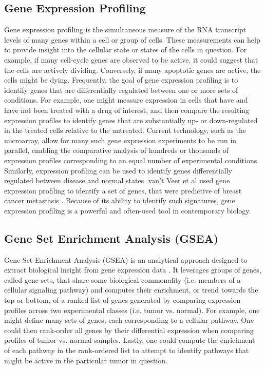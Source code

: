 \documentclass[12pt]{article}
\begin{document}
\subsection{Gene Expression Profiling}

Gene expression profiling is the simultaneous measure of the RNA transcript levels of many genes within a cell or group of cells. These measurements can help to provide insight into the cellular state or states of the cells in question. For example, if many cell-cycle genes are observed to be active, it could suggest that the cells are actively dividing. Conversely, if many apoptotic genes are active, the cells might be dying. Frequently, the goal of gene expression profiling is to identify genes that are differentially regulated between one or more sets of conditions. For example, one might measure expression in cells that have and have not been treated with a drug of interest, and then compare the resulting expression profiles to identify genes that are substantially up- or down-regulated in the treated cells relative to the untreated. Current technology, such as the microarray, allow for many such gene expression experiments to be run in parallel, enabling the comparative analysis of hundreds or thousands of expression profiles corresponding to an equal number of experimental conditions. Similarly, expression profiling can be used to identify genes differentially regulated between disease and normal states. van't Veer et al used gene expression profiling to identify a set of genes, that were predictive of breast cancer metastasis \cite{van_t_veer_gene_2002}. Because of its ability to identify such signatures, gene expression profiling is a powerful and often-used tool in contemporary biology.

\subsection{Gene Set Enrichment Analysis (GSEA)}

Gene Set Enrichment Analysis (GSEA) is an analytical approach designed to extract biological insight from gene expression data \cite{subramanian_gene_2005}. It leverages  groups of genes, called gene sets, that share some biological commonality (i.e. members of a cellular signaling pathway) and computes their enrichment, or trend towards the top or bottom, of a ranked list of genes generated by comparing expression profiles across two experimental classes (i.e. tumor vs. normal). For example, one might define many sets of genes, each corresponding to a cellular pathway. One could then rank-order all genes by their differential expression when comparing profiles of tumor vs. normal samples. Lastly, one could compute the enrichment of each pathway in the rank-ordered list to attempt to identify pathways that might be active in the particular tumor in question.
\end{document}
